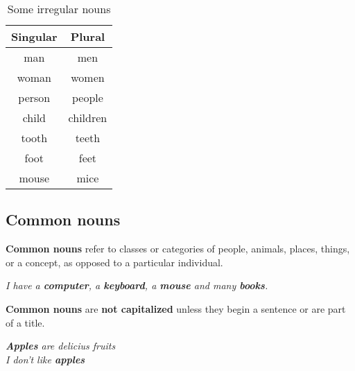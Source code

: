 \documentclass[10pt,a4paper]{article}
\begin{document}
\begin{table}[h]
\begin{center}
\begin{tabular}{|c|c|}
\hline
\textbf{Singular} & \textbf{Plural}\\
\hline
man & men\\ \hline
woman & women\\\hline
person & people\\\hline
child & children\\\hline
tooth & teeth\\\hline
foot & feet\\\hline
mouse & mice\\
\hline
\end{tabular}
\end{center}
\caption{\label{tab:nouns1}Some irregular nouns}
\end{table}


\subsection{Common nouns}
\textbf{Common nouns} refer to classes or categories of people, animals, places, things, or a concept, as opposed to a particular individual.
\begin{center}
	\textit{I have a \textbf{computer}, a \textbf{keyboard}, a \textbf{mouse} and many \textbf{books}. }
\end{center}
\indent
\textbf{Common nouns} are \textbf{not capitalized} unless they begin a sentence or are part of a title.
\begin{center}
		\textit{
		\textbf{Apples} are delicius fruits\\
				I don't like \textbf{apples} }
\end{center}
\end{document}
